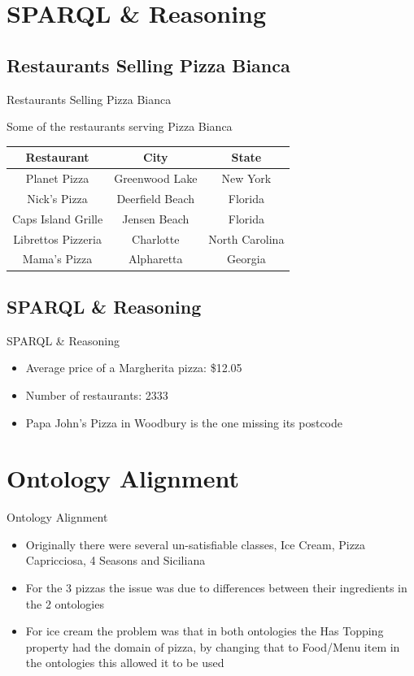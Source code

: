 \documentclass{beamer}
\begin{document}
\section{SPARQL \& Reasoning}
\subsection{Restaurants Selling Pizza Bianca}
\begin{frame}{Restaurants Selling Pizza Bianca}


\begin{center}
	Some of the restaurants serving Pizza Bianca
	\begin{tabular}{ | c | c | c | }
		\hline
		\textbf{Restaurant} & \textbf{City} & \textbf{State} \\
		\hline
		Planet Pizza & Greenwood Lake & New York \\
		\hline
		Nick's Pizza & Deerfield Beach & Florida \\
		\hline
		Caps Island Grille & Jensen Beach & Florida \\
		\hline
		Librettos Pizzeria & Charlotte & North Carolina \\
		\hline
		Mama's Pizza & Alpharetta & Georgia \\
		\hline
	\end{tabular}
\end{center}
\end{frame}

\subsection{SPARQL \& Reasoning}
\begin{frame}{SPARQL \& Reasoning}
	\begin{itemize}
		\item Average price of a Margherita pizza: \$12.05
		\item Number of restaurants: 2333
		\item Papa John's Pizza in Woodbury is the one missing its postcode
	\end{itemize}
\end{frame}

\section{Ontology Alignment}
\begin{frame}{Ontology Alignment}
	\begin{itemize}
		\item Originally there were several un-satisfiable classes, Ice Cream, Pizza Capricciosa, 4 Seasons and Siciliana
		\item For the 3 pizzas the issue was due to differences between their ingredients in the 2 ontologies
		\item For ice cream the problem was that in both ontologies the Has Topping property had the domain of pizza, by changing that to Food/Menu item in the ontologies this allowed it to be used
	\end{itemize}
\end{frame}
\end{document}
